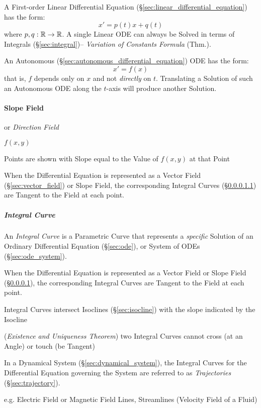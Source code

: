 A First-order Linear Differential Equation
(\S\ref{sec:linear_differential_equation}) has the form:
\[
  x' = p(t)x + q(t)
\]
where $p, q: \mathbb{R} \rightarrow \mathbb{R}$.
A single Linear ODE can always be Solved in terms of Integrals
(\S\ref{sec:integral})-- \emph{Variation of Constants Formula} (Thm.).

An Autonomous (\S\ref{sec:autonomous_differential_equation}) ODE has the form:
\[
  x' = f(x)
\]
that is, $f$ depends only on $x$ and not \emph{directly} on $t$. Translating a
Solution of such an Autonomous ODE along the $t$-axis will produce another
Solution.



\paragraph{Slope Field}\label{sec:slope_field}\hfill

or \emph{Direction Field}

$f(x,y)$

Points are shown with Slope equal to the Value of $f(x,y)$ at that Point

When the Differential Equation is represented as a Vector Field
(\S\ref{sec:vector_field}) or Slope Field, the corresponding Integral Curves
(\S\ref{sec:integral_curve}) are Tangent to the Field at each point.



\subparagraph{Integral Curve}\label{sec:integral_curve}\hfill

An \emph{Integral Curve} is a Parametric Curve that represents a
\emph{specific} Solution of an Ordinary Differential Equation
(\S\ref{sec:ode}), or System of ODEs (\S\ref{sec:ode_system}).

When the Differential Equation is represented as a Vector Field or Slope Field
(\S\ref{sec:slope_field}), the corresponding Integral Curves are Tangent to the
Field at each point.

Integral Curves intersect Isoclines (\S\ref{sec:isocline}) with the slope
indicated by the Isocline

(\emph{Existence and Uniqueness Theorem}) two Integral Curves cannot cross (at
an Angle) or touch (be Tangent)

In a Dynamical System (\S\ref{sec:dynamical_system}), the Integral Curves for
the Differential Equation governing the System are referred to as
\emph{Trajectories} (\S\ref{sec:trajectory}).

e.g. Electric Field or Magnetic Field Lines, Streamlines (Velocity Field of a
Fluid)

